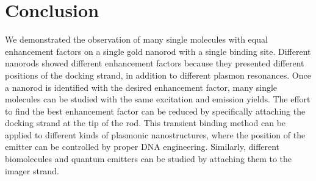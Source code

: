 \section{Conclusion}
We demonstrated the observation of many single molecules with equal enhancement factors on a single gold nanorod with a single binding site.
Different nanorods showed different enhancement factors because they presented different positions of the docking strand, in addition to different plasmon resonances.
Once a nanorod is identified with the desired enhancement factor, many single molecules can be studied with the same excitation and emission yields.
The effort to find the best enhancement factor can be reduced by specifically attaching the docking strand at the tip of the rod.
This transient binding method can be applied to different kinds of plasmonic nanostructures, where the position of the emitter can be controlled by proper DNA engineering.
Similarly, different biomolecules and quantum emitters can be studied by attaching them to the imager strand.

